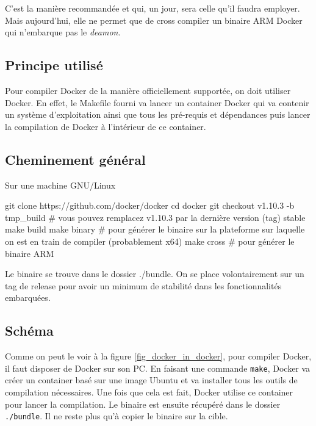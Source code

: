 \documentclass[11pt,a4paper,oneside]{report}
\newcommand{\code}[1]{\texttt{#1}} %
\begin{document}
C'est la manière recommandée et qui, un jour, sera celle qu'il faudra
employer. Mais aujourd'hui, elle ne permet que de cross compiler un
binaire ARM Docker qui n'embarque pas le \emph{deamon}.

\subsection{Principe utilisé}

Pour compiler Docker de la manière officiellement supportée, on doit utiliser Docker. En effet, le Makefile fourni va lancer un container Docker qui va contenir un système d'exploitation ainsi que tous les pré-requis et dépendances puis lancer la compilation de Docker à l'intérieur de ce container.

\subsection{Cheminement général}

Sur une machine GNU/Linux

\begin{bashcode}
git clone https://github.com/docker/docker
cd docker
git checkout v1.10.3 -b tmp_build # vous pouvez remplacez v1.10.3 par la dernière version (tag) stable
make build
make binary # pour générer le binaire sur la plateforme sur laquelle on est en train de compiler (probablement x64)
make cross # pour générer le binaire ARM
\end{bashcode}

Le binaire se trouve dans le dossier ./bundle. On se place volontairement sur un tag de release pour avoir un minimum de stabilité dans les fonctionnalités embarquées.

\subsection{Schéma}

Comme on peut le voir à la figure \ref{fig_docker_in_docker}, pour compiler Docker, il faut disposer de Docker sur son PC. En faisant une commande \code{make}, Docker va créer un container basé sur une image Ubuntu et va installer tous les outils de compilation nécessaires. Une fois que cela est fait, Docker utilise ce container pour lancer la compilation. Le binaire est ensuite récupéré dans le dossier \code{./bundle}. Il ne reste plus qu'à copier le binaire sur la cible.
\end{document}
